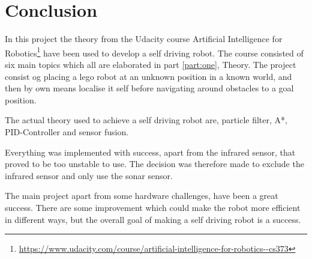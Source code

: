 \chapter{Conclusion}
\label{chp:conc}

In this project the theory from the Udacity course Artificial Intelligence for Robotics\footnote{\url{https://www.udacity.com/course/artificial-intelligence-for-robotics--cs373}} have been used to develop a self driving robot.
The course consisted of six main topics which all are elaborated in part \ref{part:one}, Theory.
The project consist og placing a lego robot at an unknown position in a known world, and then by own means localise it self before navigating around obstacles to a goal position.

The actual theory used to achieve a self driving robot are, particle filter, A*, PID-Controller and sensor fusion.

Everything was implemented with success, apart from the infrared sensor, that proved to be too unstable to use.
The decision was therefore made to exclude the infrared sensor and only use the sonar sensor.

The main project apart from some hardware challenges, have been a great success.
There are some improvement which could make the robot more efficient in different ways, but the overall goal of making a self driving robot is a success.